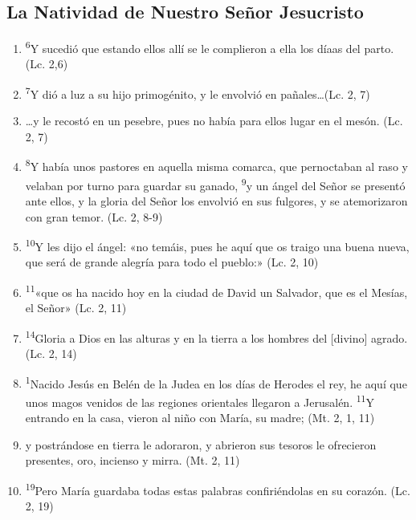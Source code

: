 \documentclass[a4paper,11pt]{article}
\begin{document}
    \subsection*{\hfil La Natividad de Nuestro Señor Jesucristo \hfil}
      
      \begin{enumerate}
        
        \item \textsuperscript{6}Y sucedió que estando ellos allí se le complieron a ella los díaas del parto. (Lc. 2,6)
        
        \item \textsuperscript{7}Y dió a luz a su hijo primogénito, y le envolvió en pañales\ldots (Lc. 2, 7)
        
        \item \ldots y le recostó en un pesebre, pues no había para ellos lugar en el mesón. (Lc. 2, 7)
        
        \item \textsuperscript{8}Y había unos pastores en aquella misma comarca, que pernoctaban al raso y velaban por turno para guardar su ganado, \textsuperscript{9}y un ángel
        del Señor se presentó ante ellos, y la gloria del Señor los envolvió en sus fulgores, y se atemorizaron con gran temor. (Lc. 2, 8-9)
        
        \item \textsuperscript{10}Y les dijo el ángel: «no temáis, pues he aquí que os traigo una buena nueva, que será de grande alegría para todo el pueblo:» (Lc. 2, 10)

        \item \textsuperscript{11}«que os ha nacido hoy en la ciudad de David un Salvador, que es el Mesías, el Señor» (Lc. 2, 11)
        
        \item \textsuperscript{14}Gloria a Dios en las alturas y en la tierra a los hombres del [divino] agrado. (Lc. 2, 14)

        \item \textsuperscript{1}Nacido Jesús en Belén de la Judea en los días de Herodes el rey, he aquí que unos magos venidos de las regiones orientales llegaron a Jerusalén.
        \textsuperscript{11}Y entrando en la casa, vieron al niño con María, su madre; (Mt. 2, 1, 11)
        
        \item y postrándose en tierra le adoraron, y abrieron sus tesoros le ofrecieron presentes, oro, incienso y mirra. (Mt. 2, 11)
        
        \item \textsuperscript{19}Pero María guardaba todas estas palabras confiriéndolas en su corazón. (Lc. 2, 19)

      \end{enumerate}
\end{document}
